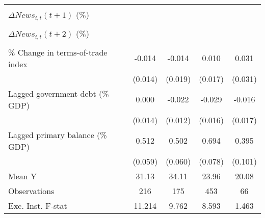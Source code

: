 {\begin{tabular}{l*{4}{c}}
                    &                     &                     &                     &                     \\
\addlinespace
$ \Delta News_{i,t}(t+1)$ (\%)&                     &                     &                     &                     \\
                    &                     &                     &                     &                     \\
\addlinespace
$ \Delta News_{i,t}(t+2)$ (\%)&                     &                     &                     &                     \\
                    &                     &                     &                     &                     \\
\addlinespace
\% Change in terms-of-trade index&      -0.014         &      -0.014         &       0.010         &       0.031         \\
                    &     (0.014)         &     (0.019)         &     (0.017)         &     (0.031)         \\
\addlinespace
Lagged government debt (\% GDP)&       0.000         &      -0.022\sym{*}  &      -0.029\sym{*}  &      -0.016         \\
                    &     (0.014)         &     (0.012)         &     (0.016)         &     (0.017)         \\
\addlinespace
Lagged primary balance (\% GDP)&       0.512\sym{***}&       0.502\sym{***}&       0.694\sym{***}&       0.395\sym{***}\\
                    &     (0.059)         &     (0.060)         &     (0.078)         &     (0.101)         \\
\midrule
Mean Y              &       31.13         &       34.11         &       23.96         &       20.08         \\
Observations        &         216         &         175         &         453         &          66         \\
Exc. Inst. F-stat   &      11.214         &       9.762         &       8.593         &       1.463         \\
\bottomrule
\end{tabular}
}
